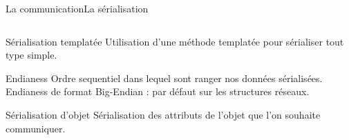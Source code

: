 \documentclass[french]{beamer}
\begin{document}
		\begin{frame}{La communication}{La sérialisation}
	        \begin{columns}
		        \begin{column}{0.65\textwidth}
			    	\begin{block}{Sérialisation templatée}
			            Utilisation d'une méthode templatée pour sérialiser tout type simple.

			        \end{block}
			        
			         \begin{block}{Endianess}
			            Ordre sequentiel dans lequel sont ranger nos données sérialisées.
			            \newline Endianess de format Big-Endian : par défaut sur les structures réseaux.
			        \end{block}

			       	\begin{block}{Sérialisation d'objet}
			            Sérialisation des attributs de l'objet que l'on souhaite communiquer.
			        \end{block}
				\end{column}


\end{columns}
\end{frame}
\end{document}
